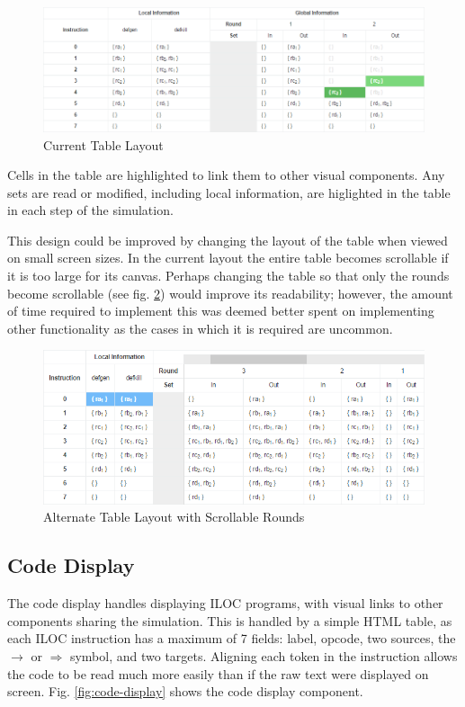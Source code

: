 \documentclass[bsc,twoside,singlespacing,parskip,logo,notimes,normalheadings]{infthesis}
\begin{document}
        \begin{figure}[!ht]
          \centering
          \includegraphics[width=\textwidth]{img/tableofresults.png}
          \caption{Current Table Layout}\label{fig:tableofresults}
        \end{figure}

        Cells in the table are highlighted to link them to other
        visual components. Any sets are read or modified, including
        local information, are higlighted in the table in each step of
        the simulation.

        This design could be improved by changing the layout of the
        table when viewed on small screen sizes. In the current layout
        the entire table becomes scrollable if it is too large for its
        canvas. Perhaps changing the table so that only the rounds
        become scrollable (see fig. \ref{fig:tablescroll})
        would improve its readability; however, the amount of time
        required to implement this was deemed better spent on
        implementing other functionality as the cases in which it is
        required are uncommon.

        \begin{figure}[!ht]
          \centering
          \includegraphics[width=13cm]{img/tablescroll.png}
          \caption{Alternate Table Layout with Scrollable Rounds}\label{fig:tablescroll}
        \end{figure}

        \subsection{Code Display}\label{sec:code-display}
        The code display handles displaying ILOC programs, with visual
        links to other components sharing the simulation. This is
        handled by a simple HTML table, as each ILOC instruction has a
        maximum of 7 fields: label, opcode, two sources, the
        $\rightarrow$ or $\Rightarrow$ symbol, and two
        targets. Aligning each token in the instruction allows the
        code to be read much more easily than if the raw text were
        displayed on screen. Fig. \ref{fig:code-display} shows the
        code display component.
\end{document}
